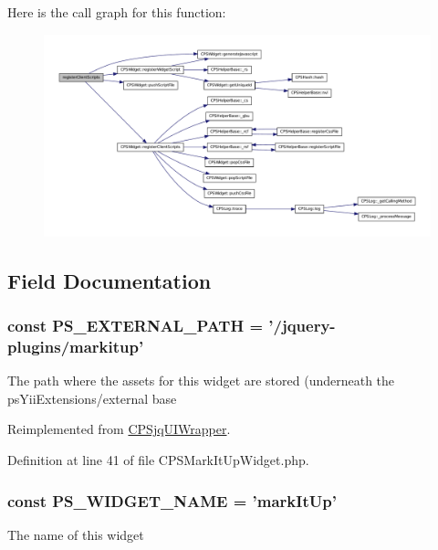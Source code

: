 Here is the call graph for this function:\nopagebreak
\begin{figure}[H]
\begin{center}
\leavevmode
\includegraphics[width=400pt]{classCPSMarkItUpWidget_ac02a66bde8e72e4909137bf748edf665_cgraph}
\end{center}
\end{figure}




\subsection{Field Documentation}
\hypertarget{classCPSMarkItUpWidget_a8ccb5e1d65c091f944a6aa8c5be834ca}{
\subsubsection[{PS\_\-EXTERNAL\_\-PATH}]{\setlength{\rightskip}{0pt plus 5cm}const {\bf PS\_\-EXTERNAL\_\-PATH} = '/jquery-\/plugins/markitup'}}
\label{classCPSMarkItUpWidget_a8ccb5e1d65c091f944a6aa8c5be834ca}
The path where the assets for this widget are stored (underneath the psYiiExtensions/external base 

Reimplemented from \hyperlink{classCPSjqUIWrapper_a8ccb5e1d65c091f944a6aa8c5be834ca}{CPSjqUIWrapper}.



Definition at line 41 of file CPSMarkItUpWidget.php.

\hypertarget{classCPSMarkItUpWidget_ae357f9dc377f7de0d12010b2ced28cbc}{
\subsubsection[{PS\_\-WIDGET\_\-NAME}]{\setlength{\rightskip}{0pt plus 5cm}const {\bf PS\_\-WIDGET\_\-NAME} = 'markItUp'}}
\label{classCPSMarkItUpWidget_ae357f9dc377f7de0d12010b2ced28cbc}
The name of this widget 

